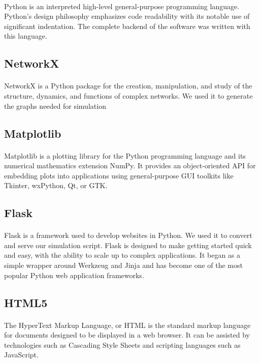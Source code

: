 \documentclass[12pt, a4paper]{extarticle}
\begin{document}
            \paragraph{} Python is an interpreted high-level general-purpose programming language. Python's design philosophy emphasizes code readability with its notable use of significant indentation. The complete backend of the software was written with this language.
        \subsection{NetworkX}
            \paragraph{}NetworkX is a Python package for the creation, manipulation, and study of the structure, dynamics, and functions of complex networks. We used it to generate the graphs needed for simulation
        \subsection{Matplotlib}
            \paragraph{}Matplotlib is a plotting library for the Python programming language and its numerical mathematics extension NumPy. It provides an object-oriented API for embedding plots into applications using general-purpose GUI toolkits like Tkinter, wxPython, Qt, or GTK.
        \subsection{Flask}
            \paragraph{} Flask is a framework used to develop websites in Python. We used it to convert and serve our simulation script. Flask is designed to make getting started quick and easy, with the ability to scale up to complex applications. It began as a simple wrapper around Werkzeug and Jinja and has become one of the most popular Python web application frameworks.
        \subsection{HTML5}
            \paragraph{} The HyperText Markup Language, or HTML is the standard markup language for documents designed to be displayed in a web browser. It can be assisted by technologies such as Cascading Style Sheets and scripting languages such as JavaScript.
\end{document}
